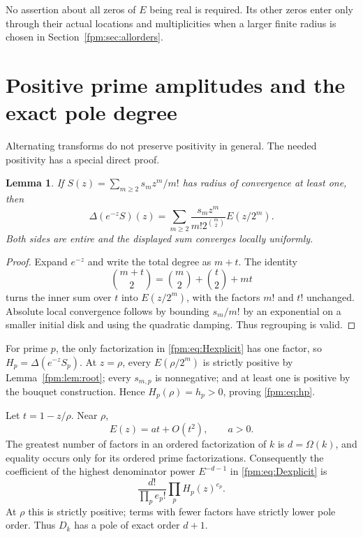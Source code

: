 \documentclass[11pt]{article}
\newtheorem{lemma}[theorem]{Lemma}
\theoremstyle{definition}\newtheorem{definition}[theorem]{Definition}
\theoremstyle{remark}\newtheorem{remark}[theorem]{Remark}
\begin{document}
No assertion about all zeros of $E$ being real is required. Its other zeros enter only through their actual locations and multiplicities when a larger finite radius is chosen in Section~\ref{fpm:sec:allorders}.

\section{Positive prime amplitudes and the exact pole degree}\label{fpm:sec:positivity}
Alternating transforms do not preserve positivity in general. The needed positivity has a special direct proof.

\begin{lemma}\label{fpm:lem:positive}
If $S(z)=\sum_{m\ge2}s_mz^m/m!$ has radius of convergence at least one, then
\begin{equation}\label{fpm:eq:convolution}
 \Delta(e^{-z}S)(z)=\sum_{m\ge2}
 \frac{s_mz^m}{m!2^{\binom m2}}E(z/2^m).
\end{equation}
Both sides are entire and the displayed sum converges locally uniformly.
\end{lemma}
\begin{proof}
Expand $e^{-z}$ and write the total degree as $m+t$. The identity
\[
 \binom{m+t}{2}=\binom m2+\binom t2+mt
\]
turns the inner sum over $t$ into $E(z/2^m)$, with the factors $m!$ and $t!$ unchanged. Absolute local convergence follows by bounding $s_m/m!$ by an exponential on a smaller initial disk and using the quadratic damping. Thus regrouping is valid.
\end{proof}

For prime $p$, the only factorization in \eqref{fpm:eq:Hexplicit} has one factor, so $H_p=\Delta(e^{-z}S_p)$. At $z=\rho$, every $E(\rho/2^m)$ is strictly positive by Lemma~\ref{fpm:lem:root}; every $s_{m,p}$ is nonnegative; and at least one is positive by the bouquet construction. Hence $H_p(\rho)=h_p>0$, proving \eqref{fpm:eq:hp}.

Let $t=1-z/\rho$. Near $\rho$,
\[
 E(z)=at+O(t^2),\qquad a>0.
\]
The greatest number of factors in an ordered factorization of $k$ is $d=\Omega(k)$, and equality occurs only for its ordered prime factorizations. Consequently the coefficient of the highest denominator power $E^{-d-1}$ in \eqref{fpm:eq:Dexplicit} is
\begin{equation}\label{fpm:eq:toppole}
 \frac{d!}{\prod_p e_p!}\prod_p H_p(z)^{e_p}.
\end{equation}
At $\rho$ this is strictly positive; terms with fewer factors have strictly lower pole order. Thus $D_k$ has a pole of exact order $d+1$.
\end{document}
